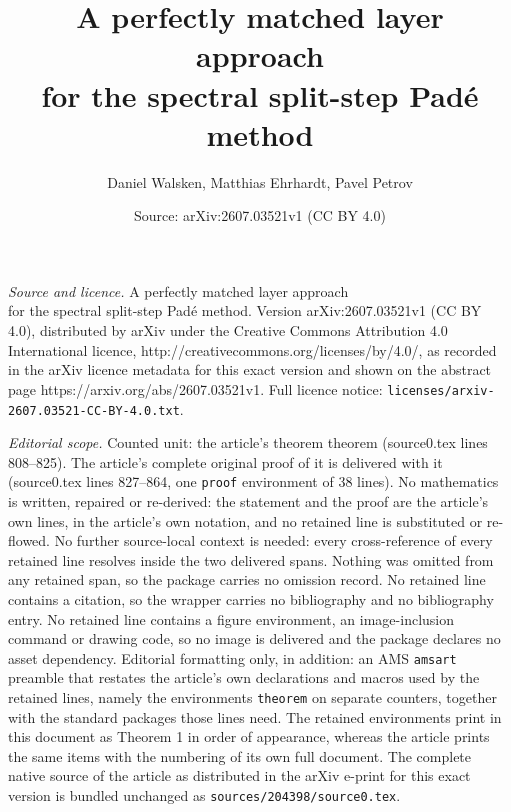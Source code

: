 \documentclass[10pt,a4paper]{amsart}
\title{A perfectly matched layer approach \\ for the spectral split-step Pad\'e method}
\author{Daniel Walsken, Matthias Ehrhardt, Pavel Petrov}
\date{Source: arXiv:2607.03521v1 (CC BY 4.0)}
\begin{document}
\maketitle

\noindent\emph{Source and licence.} A perfectly matched layer approach \\ for the spectral split-step Pad\'e method. Version arXiv:2607.03521v1 (CC BY 4.0), distributed by arXiv under the Creative Commons Attribution 4.0 International licence, http://creativecommons.org/licenses/by/4.0/, as recorded in the arXiv licence metadata for this exact version and shown on the abstract page https://arxiv.org/abs/2607.03521v1. Full licence notice: \texttt{licenses/arxiv-2607.03521-CC-BY-4.0.txt}.\par\smallskip

\noindent\textit{Editorial scope.} Counted unit: the article's theorem theorem (source0.tex lines 808--825). The article's complete original proof of it is delivered with it (source0.tex lines 827--864, one \texttt{proof} environment of 38 lines). No mathematics is written, repaired or re-derived: the statement and the proof are the article's own lines, in the article's own notation, and no retained line is substituted or re-flowed.  No further source-local context is needed: every cross-reference of every retained line resolves inside the two delivered spans.  Nothing was omitted from any retained span, so the package carries no omission record.  No retained line contains a citation, so the wrapper carries no bibliography and no bibliography entry.  No retained line contains a figure environment, an image-inclusion command or drawing code, so no image is delivered and the package declares no asset dependency.  Editorial formatting only, in addition: an AMS \texttt{amsart} preamble that restates the article's own declarations and macros used by the retained lines, namely the environments \texttt{theorem} on separate counters, together with the standard packages those lines need.  The retained environments print in this document as Theorem 1 in order of appearance, whereas the article prints the same items with the numbering of its own full document.  The complete native source of the article as distributed in the arXiv e-print for this exact version is bundled unchanged as \texttt{sources/204398/source0.tex}.
\end{document}
